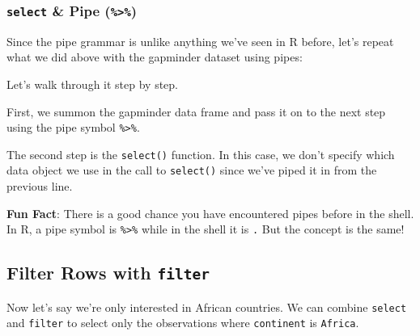 \documentclass[]{book}
\newenvironment{Shaded}{\begin{snugshade}}{\end{snugshade}}
\newcommand{\KeywordTok}[1]{\textcolor[rgb]{0.13,0.29,0.53}{\textbf{#1}}}
\newcommand{\StringTok}[1]{\textcolor[rgb]{0.31,0.60,0.02}{#1}}
\newcommand{\OperatorTok}[1]{\textcolor[rgb]{0.81,0.36,0.00}{\textbf{#1}}}
\newcommand{\NormalTok}[1]{#1}
\begin{document}
\subsubsection*{\texorpdfstring{\texttt{select} \& Pipe
(\texttt{\%\textgreater{}\%})}{select \& Pipe (\%\textgreater{}\%)}}\label{select-pipe}

Since the pipe grammar is unlike anything we've seen in R before, let's
repeat what we did above with the gapminder dataset using pipes:

\begin{Shaded}
\end{Shaded}

Let's walk through it step by step.

First, we summon the gapminder data frame and pass it on to the next
step using the pipe symbol \texttt{\%\textgreater{}\%}.

The second step is the \texttt{select()} function. In this case, we
don't specify which data object we use in the call to \texttt{select()}
since we've piped it in from the previous line.

\textbf{Fun Fact}: There is a good chance you have encountered pipes
before in the shell. In R, a pipe symbol is \texttt{\%\textgreater{}\%}
while in the shell it is \texttt{\textbar{}.} But the concept is the
same!

\subsection{\texorpdfstring{Filter Rows with
\texttt{filter}}{Filter Rows with filter}}\label{filter-rows-with-filter}

Now let's say we're only interested in African countries. We can combine
\texttt{select} and \texttt{filter} to select only the observations
where \texttt{continent} is \texttt{Africa}.

\begin{Shaded}
\end{Shaded}
\end{document}
